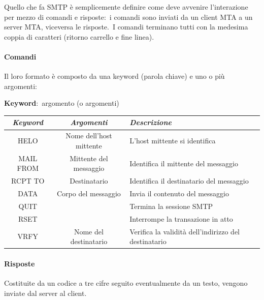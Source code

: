 Quello che fa SMTP è semplicemente definire come deve avvenire l'interazione per mezzo di comandi e risposte:\ i comandi sono inviati da un client MTA a un server MTA, viceversa le risposte.\
I comandi terminano tutti con la medesima coppia di caratteri (ritorno carrello e fine linea).

\paragraph{Comandi} Il loro formato è composto da una keyword (parola chiave) e uno o più argomenti:

\begin{center}
    \textbf{Keyword}:\ argomento (o argomenti)
\end{center}

\begin{table}[H]
    \centering
    \begin{tabular}{|c|c|m{12em}|}
        \hline
        \emph{Keyword} & \emph{Argomenti}        & \emph{Descrizione}                                   \\
        \hline
        HELO           & Nome dell'host mittente & L'host mittente si identifica                        \\
        \hline
        MAIL FROM      & Mittente del messaggio  & Identifica il mittente del messaggio                 \\
        \hline
        RCPT TO        & Destinatario            & Identifica il destinatario del messaggio             \\
        \hline
        DATA           & Corpo del messaggio     & Invia il contenuto del messaggio                     \\
        \hline
        QUIT           &                         & Termina la sessione SMTP                             \\
        \hline
        RSET           &                         & Interrompe la transazione in atto                    \\
        \hline
        VRFY           & Nome del destinatario   & Verifica la validità dell'indirizzo del destinatario \\
        \hline
    \end{tabular}
\end{table}

\paragraph{Risposte} Costituite da un codice a tre cifre seguito eventualmente da un testo, vengono inviate dal server al client.


